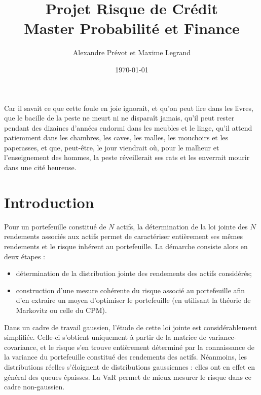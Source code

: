 \documentclass{article}
\title{\textbf{Projet Risque de Cr\'{e}dit \\
Master Probabilit\'{e} et Finance } 
}
\date{\today}
\author{Alexandre Pr\'evot et Maxime Legrand}
\begin{document}
\maketitle

\newpage 

\newsavebox{\auteurbm}
\newenvironment{Bonmot}[1]%
  {\small\slshape%
  \savebox{\auteurbm}{\upshape\sffamily#1}%
  \begin{flushright}}
  {\usebox{\auteurbm}
  \end{flushright}\normalsize\upshape}
 \begin{Bonmot}{La peste, Albert Camus}
  Car il savait ce que cette foule en joie ignorait, et qu'on peut lire dans les livres, que le bacille de la peste ne meurt ni ne disparaît jamais, qu'il peut rester pendant des dizaines d'années endormi dans les meubles et le linge, qu'il attend patiemment dans les chambres, les caves, les malles, les mouchoirs et les paperasses, et que, peut-être, le jour viendrait où, pour le malheur et l'enseignement des hommes, la peste réveillerait ses rats et les enverrait mourir dans une cité heureuse.
\end{Bonmot}

\newpage 

\tableofcontents

\newpage

\section{Introduction}

Pour un portefeuille constitué de $N$ actifs, la détermination de la loi jointe des $N$ rendements  associés aux actifs permet de caractériser entièrement ses mêmes rendements et le risque inhérent au portefeuille. La démarche consiste alors en deux étapes :
\begin{itemize}
\item détermination de la distribution jointe des rendements des actifs considérés;
\item construction d'une mesure cohérente du risque associé au portefeuille afin d'en extraire un moyen d'optimiser le portefeuille (en utilisant la théorie de Markovitz ou celle du CPM).
\end{itemize}
Dans un cadre de travail gaussien, l'étude de cette loi jointe est considérablement simplifiée. Celle-ci s'obtient uniquement à partir de la matrice de variance-covariance, et le risque s'en trouve entièrement déterminé par la connaissance de la variance du portefeuille constitué des rendements des actifs. Néanmoins, les distributions réelles s'éloignent de distributions gaussiennes : elles ont en effet en général des queues épaisses. La VaR permet de mieux mesurer le risque dans ce cadre non-gaussien.
\end{document}
